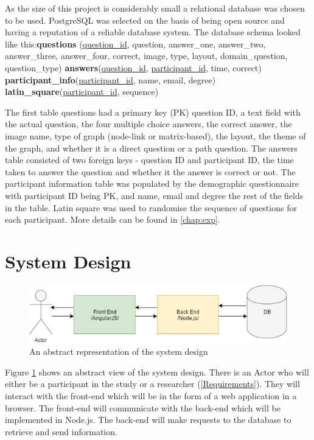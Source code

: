 \documentclass{l4proj}
\begin{document}
As the size of this project is considerably small a relational database was chosen to be used. PostgreSQL was selected on the basis of being open source and having a reputation of a reliable database system. The database schema looked like this:\newline \textbf{questions} (\underline{question\_id}, question, answer\_one, answer\_two, answer\_three,
		answer\_four, correct, image, type, layout, domain\_question, question\_type) \newline
\textbf{answers}(\underline{question\_id}, \underline{participant\_id}, time, correct) \newline
\textbf{participant\_info}(\underline{participant\_id}, name, email, degree) \newline
\textbf{latin\_square}(\underline{participant\_id}, sequence) \newline

The first table questions had a primary key (PK) question ID, a text field with the actual question, the four multiple choice answers, the correct answer, the image name, type of graph (node-link or matrix-based), the layout, the theme of the graph, and whether it is a direct question or a path question. The answers table consisted of two foreign keys - question ID and participant ID, the time taken to answer the question and whether it the answer is correct or not. The participant information table was populated by the demographic questionnaire with participant ID being PK, and name, email and degree the rest of the fields in the table. Latin square was used to randomise the sequence of questions for each participant. More details can be found in \autoref{chap:exp}.

\section{System Design}

\begin{figure}[H]
\centering
\includegraphics[width=11.5cm]{abstractDesign.png}
\caption{An abstract representation of the system design}
\label{abstractDesign}
\end{figure}


Figure \ref{abstractDesign} shows an abstract view of the system design. There is an Actor who will either be a participant in the study or a researcher (\autoref{Requirements}). They will interact with the front-end which will be in the form of a web application in a browser. The front-end will communicate with the back-end which will be implemented in Node.js. The back-end will make requests to the database to retrieve and send information. 
\end{document}
